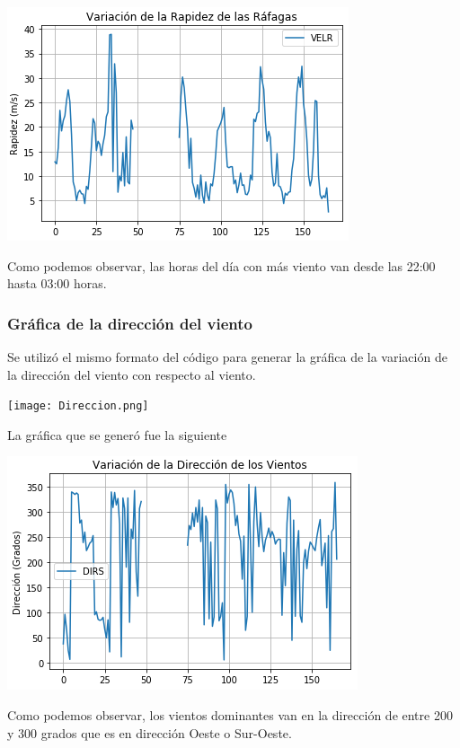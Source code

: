 \documentclass{article}
\begin{document}
\begin{center}
    \includegraphics[scale = 1]{GRafagas.png}
\end{center}

Como podemos observar, las horas del día con más viento van desde las 22:00 hasta 03:00 horas.

\subsubsection{Gráfica de la dirección del viento}
Se utilizó el mismo formato del código para generar la gráfica de la variación de la dirección del viento con respecto al viento. 

\begin{center}
    \texttt{[image: Direccion.png]}
\end{center}

La gráfica que se generó fue la siguiente
\begin{center}
    \includegraphics[scale = 1]{GDireccion.png}
\end{center}
Como podemos observar, los vientos dominantes van en la dirección de entre 200 y 300 grados que es en dirección Oeste o Sur-Oeste.
\end{document}
